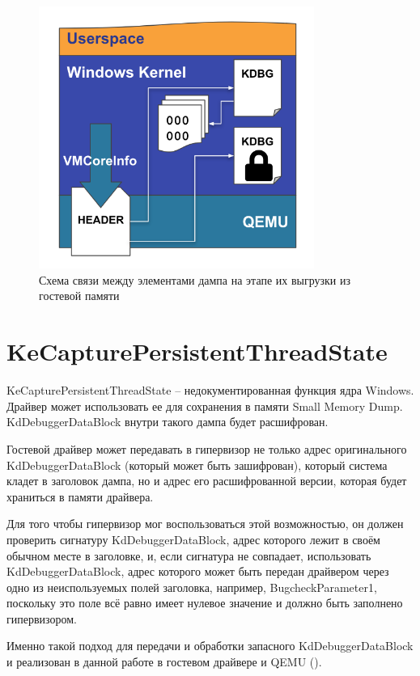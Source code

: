 \documentclass{mipt-thesis-bs}
\begin{document}
\begin{figure}[h!]
\begin{center}
    \captionsetup{justification=centering}
    \includegraphics[width=9cm]{s1337.png}
    \caption{Схема связи между элементами дампа на этапе их выгрузки из гостевой памяти}
    \label{fig:scheme22}
\end{center}
\end{figure}

\section*{KeCapturePersistentThreadState}

KeCapturePersistentThreadState -- недокументированная функция ядра Windows. Драйвер может использовать ее для сохранения в памяти Small Memory Dump\cite{kcpts}. KdDebuggerDataBlock внутри такого дампа будет расшифрован.

Гостевой драйвер может передавать в гипервизор не только адрес оригинального KdDebuggerDataBlock (который может быть зашифрован), который система кладет в заголовок дампа, но и адрес его расшифрованной версии, которая будет храниться в памяти драйвера.

Для того чтобы гипервизор мог воспользоваться этой возможностью, он должен проверить сигнатуру KdDebuggerDataBlock, адрес которого лежит в своём обычном месте в заголовке, и, если сигнатура не совпадает, использовать KdDebuggerDataBlock, адрес которого может быть передан драйвером через одно из неиспользуемых полей заголовка, например, BugcheckParameter1, поскольку это поле всё равно имеет нулевое значение и должно быть заполнено гипервизором.

Именно такой подход для передачи и обработки запасного KdDebuggerDataBlock и реализован в данной работе в гостевом драйвере и QEMU ().
\end{document}
